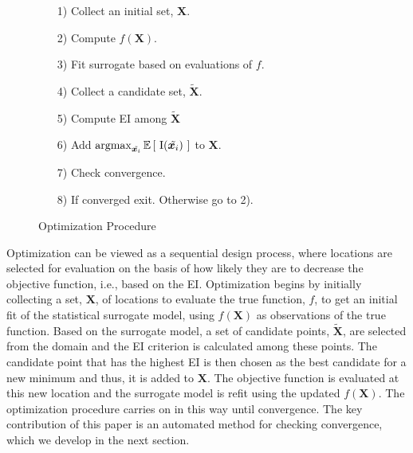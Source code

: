 \documentclass{article}
\newcommand{\E}[1]{
        \mathbb{E}\left[~#1~\right]
}
\newcommand{\argmax}{\operatornamewithlimits{argmax}}
\def \Eix {
        \mathbb{E}\left[\text{I}(\bm{x})\right]
}
\begin{document}
%
%
\begin{figure}
	\vspace{-0.8cm}
        \singlespacing
        \caption{Optimization Procedure}
        \begin{itemize}
        \item[1)] Collect an initial set, $\bm{X}$.
        \item[2)] Compute $f(\bm{X})$.
        \item[3)] Fit surrogate based on evaluations of $f$.
        \item[4)] Collect a candidate set, $\tilde{\bm{X}}$.
        \item[5)] Compute EI among $\tilde{\bm{X}}$
        \item[6)] Add $\argmax_{\tilde{\bm{x}_i}} \E{\text{I}(\tilde{\bm{x}_i})}$ to $\bm{X}$.
        \item[7)] Check convergence.
        \item[8)] If converged exit. Otherwise go to 2).
        \end{itemize}
        \doublespacing
        \label{procedure}
\end{figure}
%
Optimization can be viewed as a sequential design process, where locations are 
selected for evaluation on the basis of how likely they are to decrease the 
objective function, i.e., based on the EI. Optimization begins by initially 
collecting a set, $\bm{X}$, of locations to evaluate the true function, $f$, 
to get an initial fit of the statistical surrogate model, using 
$f(\bm{X})$ as observations of the true function. Based on the 
surrogate model, a set of candidate points, $\tilde{\bm{X}}$, are selected 
from the domain and the EI criterion is calculated among these points. The 
candidate point that has the highest EI is then chosen as the best candidate for 
a new minimum and thus, it is added to $\bm{X}$. The objective function is 
evaluated at this new location and the surrogate model is refit using the 
updated $f(\bm{X})$. The optimization procedure carries on in this way until 
convergence. The key contribution of this paper is an automated method for 
checking convergence, which we develop in the next section. 
\end{document}
